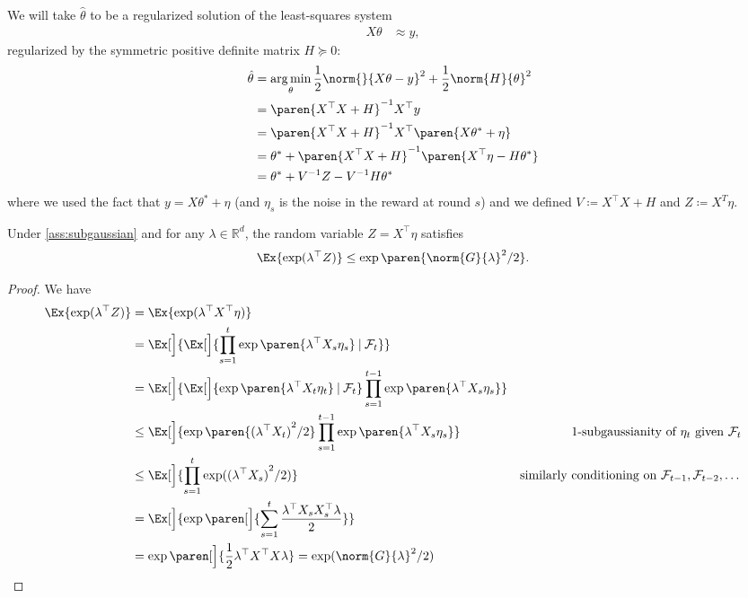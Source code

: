 \documentclass{article}
\newcommand{\defeq}{\coloneq}
\newcommand{\inv}[1]{#1^{-1}}
\newcommand{\Real}{\mathds{R}}
\newcommand{\argmin}{\operatorname*{arg\,min}}
\newcommand\given[1][\delimsize]{%
  \providecommand{\delimsize}{}
  \nonscript\:#1\vert\allowbreak\nonscript\:\mathopen{}
}
\DeclarePairedDelimiter{\paren}()
\providecommand\transp{\top}
\let\transpsymbol\transp
\renewcommand{\transp}[1]{#1^\transpsymbol}
\begin{document}
We will take $\hat{\theta}$ to be a regularized solution of the
least-squares system
\begin{align*}
  X\theta &\approx y,
\end{align*}
regularized by the symmetric positive definite matrix $H \succeq 0$:
\begin{align*}
  \hat{\theta} &= \argmin_\theta \frac{1}{2}\norm{}{X\theta - y}^2 + \frac{1}{2}\norm{H}{\theta}^2 \\
               &= \inv{\paren{\transp{X}X + H}} \transp{X}y \\
               &= \inv{\paren{\transp{X}X + H}} \transp{X} \paren{X\theta^* + \eta} \\
               &= \theta^* + \inv{\paren{\transp{X}X + H}}\paren{\transp{X}\eta - H\theta^*} \\
               &= \theta^* + \inv{V}Z - \inv{V}H\theta^*
\end{align*}
where we used the fact that $y = X\theta^* + \eta$ (and $\eta_s$ is the
noise in the reward at round $s$) and we defined $V \defeq \transp{X}X
+ H$ and $Z\defeq X^T\eta$.

\begin{lemma}\label{lemma:subgaussian-z}
  Under \cref{ass:subgaussian} and for any
$\lambda\in\Real^d$, the random variable $Z = \transp{X}\eta$ satisfies
  \begin{align*}
    \Ex{\exp(\transp{\lambda}Z)} \le \exp\paren{\norm{G}{\lambda}^2/2}.
  \end{align*}

  \begin{proof}
    We have
    \begin{align*}
      \Ex{\exp(\transp{\lambda}Z)}
      &= \Ex{\exp(\transp{\lambda}\transp{X}\eta)} \\
      &= \Ex[\Big]{\Ex[\Big]{\prod_{s=1}^t \exp\paren{\transp{\lambda}X_s\eta_s} \given \mathcal{F}_t}} \\
      &= \Ex[\Big]{\Ex[\Big]{\exp\paren{\transp{\lambda}X_t\eta_t} \given \mathcal{F}_t} \prod_{s=1}^{t-1} \exp\paren{\transp{\lambda}X_s\eta_s}} \\
      &\le \Ex[\Big]{\exp\paren{{(\transp{\lambda}X_t)}^2/2}
        \prod_{s=1}^{t-1} \exp\paren{\transp{\lambda}X_s\eta_s}}
      &\text{1-subgaussianity of $\eta_t$ given $\mathcal{F}_t$}\\
      &\le \Ex[\Big]{\prod_{s=1}^t\exp({(\transp{\lambda}X_s)}^2/2)}
      &\text{similarly conditioning on $\mathcal{F}_{t-1},\mathcal{F}_{t-2},\dotsc$}\\
      &= \Ex[\Big]{\exp\paren[\Big]{\sum_{s=1}^t\frac{\transp{\lambda}X_s\transp{X_s}\lambda}{2}}} \\
      &= \exp\paren[\Big]{\frac{1}{2}\transp{\lambda}\transp{X}X\lambda}
        = \exp(\norm{G}{\lambda}^2/2)
      &\qedhere
    \end{align*}
  \end{proof}
\end{lemma}
\end{document}

